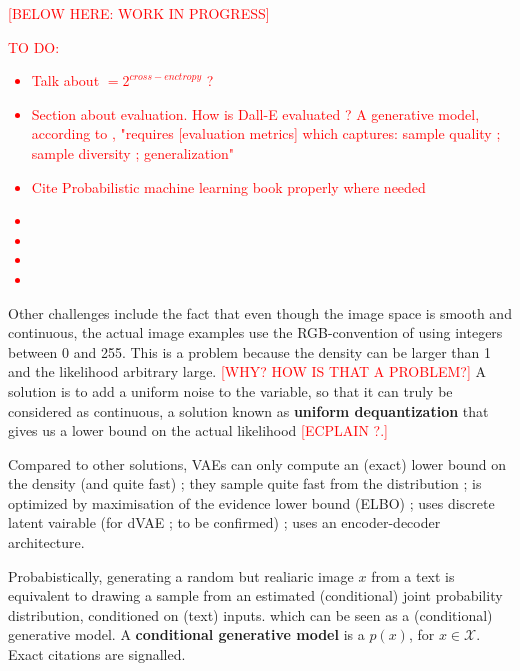 \documentclass{article}
\begin{document}
\begin{appendix}
\textcolor{red}{[BELOW HERE: WORK IN PROGRESS]} \newline

\textcolor{red}{
TO DO:
\begin{itemize}
    \item Talk about $ = 2^{cross-enctropy}$ ?
    \item Section about evaluation. How is Dall-E evaluated ? A generative model, according to \cite{probml-advanced}, "requires [evaluation metrics] which captures: sample quality ; sample diversity ; generalization"
    \item Cite Probabilistic machine learning book properly where needed
    \item 
    \item 
    \item 
    \item 
\end{itemize}}

Other challenges include the fact that even though the image space is smooth and continuous, the actual image examples use the RGB-convention of using integers between 0 and 255. This is a problem because the density can be larger than 1 and the likelihood arbitrary large. \textcolor{red}{[WHY? HOW IS THAT A PROBLEM?]} A solution is to add a uniform noise to the variable, so that it can truly be considered as continuous, a solution known as \textbf{uniform dequantization} that gives us a lower bound on the actual likelihood \textcolor{red}{[ECPLAIN ?.]}

Compared to other solutions, VAEs can only compute an (exact) lower bound on the density (and quite fast) ; they sample quite fast from the distribution ; is optimized by maximisation of the evidence lower bound (ELBO) ; uses discrete latent vairable (for dVAE ; to be confirmed) ; uses an encoder-decoder architecture. 


Probabistically, generating a random but realiaric image $x$ from a text is equivalent to drawing a sample from an estimated (conditional) joint probability distribution, conditioned on (text) inputs. which can be seen  as a (conditional) generative model. A \textbf{conditional generative model} is a  $p(x)$, for $x \in \mathcal{X}$. Exact citations are signalled.


\end{appendix}
\end{document}
